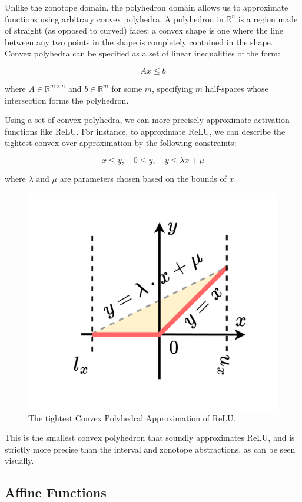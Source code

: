 \documentclass[oneside,11pt,dvipsnames]{book}
\numberwithin{equation}{section}
\theoremstyle{definition}
\theoremstyle{remark}
\begin{document}
Unlike the zonotope domain, the polyhedron domain allows us to approximate functions using arbitrary convex polyhedra. A polyhedron in \(\mathbb{R}^n\) is a region made of straight (as opposed to curved) faces; a convex shape is one where the line between any two points in the shape is completely contained in the shape. Convex polyhedra can be specified as a set of linear inequalities of the form:

\[
Ax \leq b
\]

where \(A \in \mathbb{R}^{m \times n}\) and \(b \in \mathbb{R}^m\) for some \(m\), specifying \(m\) half-spaces whose intersection forms the polyhedron.

Using a set of convex polyhedra, we can more precisely approximate activation functions like ReLU. For instance, to approximate ReLU, we can describe the tightest convex over-approximation by the following constraints:

\[
x \leq y, \quad 0 \leq y, \quad y \leq \lambda x + \mu
\]

where \(\lambda\) and \(\mu\) are parameters chosen based on the bounds of \(x\).

\begin{figure}[h]
    \centering
    \includegraphics[width=0.5\linewidth]{figure/3-lines-polytope.png}
    \caption{The tightest Convex Polyhedral Approximation of ReLU.}
    \label{fig:enter-label}
\end{figure}

This is the smallest convex polyhedron that soundly approximates ReLU, and is strictly more precise than the interval and zonotope abstractions, as can be seen visually.

\subsection{Affine Functions}
\end{document}
